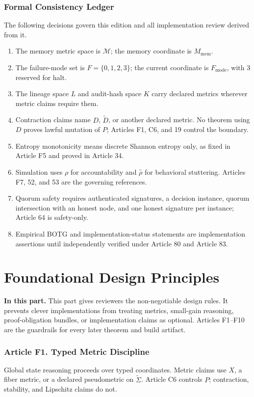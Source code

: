 \documentclass[10pt,oneside]{article}
\theoremstyle{definition}
\theoremstyle{remark}
\newcommand{\mem}{\mathrm{mem}}
\newcommand{\mode}{\mathrm{mode}}
\newcommand{\PartIntro}[1]{\noindent\textbf{In this part.} #1\par\medskip}
\begin{document}
\section{Formal Consistency Ledger}
The following decisions govern this edition and all implementation review derived from it.
\begin{enumerate}
  \item The memory metric space is \(\mathcal M\); the memory coordinate is \(M_{\mem}\).
  \item The failure-mode set is \(F=\{0,1,2,3\}\); the current coordinate is \(F_{\mode}\), with \(3\) reserved for halt.
  \item The lineage space \(L\) and audit-hash space \(K\) carry declared metrics wherever metric claims require them.
  \item Contraction claims name \(D\), \(\widetilde D\), or another declared metric. No theorem using \(D\) proves lawful mutation of \(P\); Articles F1, C6, and 19 control the boundary.
  \item Entropy monotonicity means discrete Shannon entropy only, as fixed in Article F5 and proved in Article 34.
  \item Simulation uses \(\rho\) for accountability and \(\widehat\rho\) for behavioral stuttering. Articles F7, 52, and 53 are the governing references.
  \item Quorum safety requires authenticated signatures, a decision instance, quorum intersection with an honest node, and one honest signature per instance; Article 64 is safety-only.
  \item Empirical BOTG and implementation-status statements are implementation assertions until independently verified under Article 80 and Article 83.
\end{enumerate}

\part{Foundational Design Principles}

\PartIntro{This part gives reviewers the non-negotiable design rules. It prevents clever implementations from treating metrics, small-gain reasoning, proof-obligation bundles, or implementation claims as optional. Articles F1--F10 are the guardrails for every later theorem and build artifact.}

\section{Article F1. Typed Metric Discipline}
Global state reasoning proceeds over typed coordinates. Metric claims use \(X\), a fiber metric, or a declared pseudometric on \(\widetilde{\Sigma}\). Article C6 controls \(P\); contraction, stability, and Lipschitz claims do not.
\end{document}
